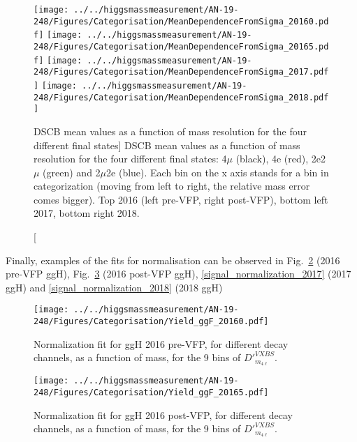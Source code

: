 \begin{figure}[!htbp]
\begin{center}
		\texttt{[image: ../../higgsmassmeasurement/AN-19-248/Figures/Categorisation/MeanDependenceFromSigma\_20160.pdf]}
		\texttt{[image: ../../higgsmassmeasurement/AN-19-248/Figures/Categorisation/MeanDependenceFromSigma\_20165.pdf]}
		\texttt{[image: ../../higgsmassmeasurement/AN-19-248/Figures/Categorisation/MeanDependenceFromSigma\_2017.pdf]}
		\texttt{[image: ../../higgsmassmeasurement/AN-19-248/Figures/Categorisation/MeanDependenceFromSigma\_2018.pdf]}
\caption
[DSCB mean values as a function of mass resolution for the four different final states]
{DSCB mean values as a function of mass resolution for the four different final states: 4$\mu$ (black),
4e (red), 2e2$\mu$ (green) and 2$\mu$2e (blue). Each bin on the x axis stands for a bin 
in categorization (moving from left to right, the relative mass error comes bigger). 
Top 2016 (left pre-VFP, right post-VFP), bottom left 2017, bottom right 2018.}
\label{MeanDependence}
\end{center}
\end{figure}
Finally, examples of the fits for normalisation can be observed in 
Fig.~\ref{signal_normalization_20160} (2016 pre-VFP ggH),
Fig.~\ref{signal_normalization_20165} (2016 post-VFP ggH), 
\ref{signal_normalization_2017} (2017 ggH) and 
\ref{signal_normalization_2018} (2018 ggH)
\begin{figure}[!htbp]
\begin{center}
		\texttt{[image: ../../higgsmassmeasurement/AN-19-248/Figures/Categorisation/Yield\_ggF\_20160.pdf]}
\caption{
Normalization fit for ggH 2016 pre-VFP, for different decay channels, as a function
of mass, for the 9 bins of $D'^{VXBS}_{m_{4\ell}}$.}
\label{signal_normalization_20160}
\end{center}
\end{figure}
\begin{figure}[!htbp]
\begin{center}
		\texttt{[image: ../../higgsmassmeasurement/AN-19-248/Figures/Categorisation/Yield\_ggF\_20165.pdf]}
\caption{
Normalization fit for ggH 2016 post-VFP, for different decay channels, as a function
of mass, for the 9 bins of $D'^{VXBS}_{m_{4\ell}}$.}
\label{signal_normalization_20165}
\end{center}
\end{figure}
